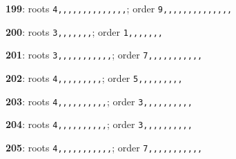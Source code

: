 \noindent \textbf{199}: roots \texttt{4,,,,,,,,,,,,,,}; order \texttt{9,,,,,,,,,,,,,,}\par
\noindent \textbf{200}: roots \texttt{3,,,,,,,}; order \texttt{1,,,,,,,}\par
\noindent \textbf{201}: roots \texttt{3,,,,,,,,,,,}; order \texttt{7,,,,,,,,,,,}\par
\noindent \textbf{202}: roots \texttt{4,,,,,,,,,}; order \texttt{5,,,,,,,,,}\par
\noindent \textbf{203}: roots \texttt{4,,,,,,,,,,}; order \texttt{3,,,,,,,,,,}\par
\noindent \textbf{204}: roots \texttt{4,,,,,,,,,,}; order \texttt{3,,,,,,,,,,}\par
\noindent \textbf{205}: roots \texttt{4,,,,,,,,,,,}; order \texttt{7,,,,,,,,,,,}\par
